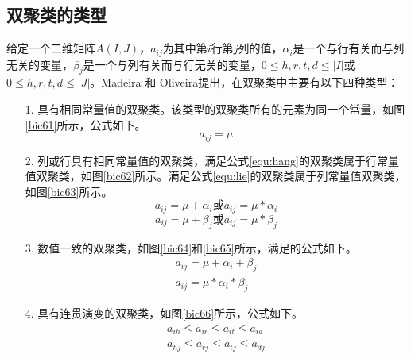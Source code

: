   \subsection{双聚类的类型}
  给定一个二维矩阵$A(I,J)$，$a_{ij}$为其中第$i$行第$j$列的值，$\alpha_i$是一个与行有关而与列无关的变量，$\beta_j$是一个与列有关而与行无关的变量，$0\le h,r,t,d \le |I|$或$0\le h,r,t,d \le |J|$。Madeira 和 Oliveira\cite{madeira2004biclustering}提出，在双聚类中主要有以下四种类型：
  \begin{enumerate}
    \item[1.] 具有相同常量值的双聚类。该类型的双聚类所有的元素为同一个常量，如图\ref{bic61}所示，公式如下。
    \begin{equation}
      a_{ij}=\mu
    \end{equation}

    \item[2.] 列或行具有相同常量值的双聚类，满足公式\ref{equ:hang}的双聚类属于行常量值双聚类，如图\ref{bic62}所示。满足公式\ref{equ:lie}的双聚类属于列常量值双聚类，如图\ref{bic63}所示。
    \begin{equation}\label{equ:hang}
    a_{ij}=\mu+\alpha_i \mbox{或} a_{ij}=\mu *\alpha_i 
    \end{equation}
    \begin{equation}\label{equ:lie}
    a_{ij}=\mu+\beta_j  \mbox{或} a_{ij}=\mu *\beta_j
    \end{equation}
    
    \item[3.] 数值一致的双聚类，如图\ref{bic64}和\ref{bic65}所示，满足的公式如下。
    \begin{align}
    a_{ij}=\mu+\alpha_i+\beta_j \label{equ:jiafa}\\
    a_{ij}=\mu *\alpha_i*\beta_j\label{equ:chengfa}
    \end{align} 

    \item[4.] 具有连贯演变的双聚类，如图\ref{bic66}所示，公式如下。
    \begin{align}
    a_{ih}\le a_{ir}\le a_{it}\le a_{id} \\
    a_{hj}\le a_{rj}\le a_{tj}\le  a_{dj} 
    \end{align}
  \end{enumerate}

